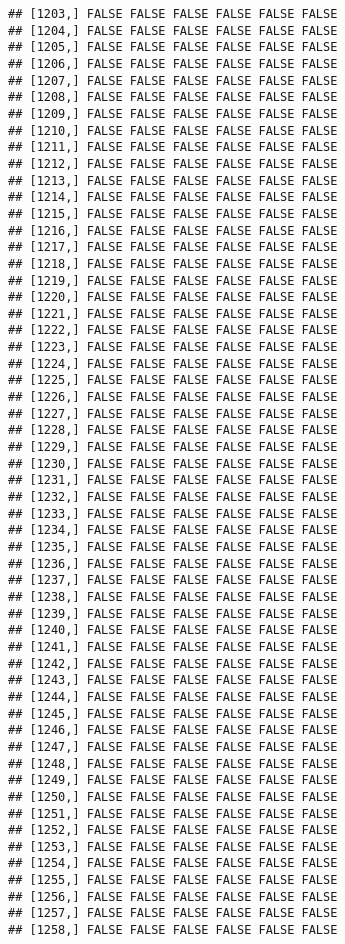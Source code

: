 \documentclass[
]{article}
\begin{document}
\begin{verbatim}
## [1203,] FALSE FALSE FALSE FALSE FALSE FALSE
## [1204,] FALSE FALSE FALSE FALSE FALSE FALSE
## [1205,] FALSE FALSE FALSE FALSE FALSE FALSE
## [1206,] FALSE FALSE FALSE FALSE FALSE FALSE
## [1207,] FALSE FALSE FALSE FALSE FALSE FALSE
## [1208,] FALSE FALSE FALSE FALSE FALSE FALSE
## [1209,] FALSE FALSE FALSE FALSE FALSE FALSE
## [1210,] FALSE FALSE FALSE FALSE FALSE FALSE
## [1211,] FALSE FALSE FALSE FALSE FALSE FALSE
## [1212,] FALSE FALSE FALSE FALSE FALSE FALSE
## [1213,] FALSE FALSE FALSE FALSE FALSE FALSE
## [1214,] FALSE FALSE FALSE FALSE FALSE FALSE
## [1215,] FALSE FALSE FALSE FALSE FALSE FALSE
## [1216,] FALSE FALSE FALSE FALSE FALSE FALSE
## [1217,] FALSE FALSE FALSE FALSE FALSE FALSE
## [1218,] FALSE FALSE FALSE FALSE FALSE FALSE
## [1219,] FALSE FALSE FALSE FALSE FALSE FALSE
## [1220,] FALSE FALSE FALSE FALSE FALSE FALSE
## [1221,] FALSE FALSE FALSE FALSE FALSE FALSE
## [1222,] FALSE FALSE FALSE FALSE FALSE FALSE
## [1223,] FALSE FALSE FALSE FALSE FALSE FALSE
## [1224,] FALSE FALSE FALSE FALSE FALSE FALSE
## [1225,] FALSE FALSE FALSE FALSE FALSE FALSE
## [1226,] FALSE FALSE FALSE FALSE FALSE FALSE
## [1227,] FALSE FALSE FALSE FALSE FALSE FALSE
## [1228,] FALSE FALSE FALSE FALSE FALSE FALSE
## [1229,] FALSE FALSE FALSE FALSE FALSE FALSE
## [1230,] FALSE FALSE FALSE FALSE FALSE FALSE
## [1231,] FALSE FALSE FALSE FALSE FALSE FALSE
## [1232,] FALSE FALSE FALSE FALSE FALSE FALSE
## [1233,] FALSE FALSE FALSE FALSE FALSE FALSE
## [1234,] FALSE FALSE FALSE FALSE FALSE FALSE
## [1235,] FALSE FALSE FALSE FALSE FALSE FALSE
## [1236,] FALSE FALSE FALSE FALSE FALSE FALSE
## [1237,] FALSE FALSE FALSE FALSE FALSE FALSE
## [1238,] FALSE FALSE FALSE FALSE FALSE FALSE
## [1239,] FALSE FALSE FALSE FALSE FALSE FALSE
## [1240,] FALSE FALSE FALSE FALSE FALSE FALSE
## [1241,] FALSE FALSE FALSE FALSE FALSE FALSE
## [1242,] FALSE FALSE FALSE FALSE FALSE FALSE
## [1243,] FALSE FALSE FALSE FALSE FALSE FALSE
## [1244,] FALSE FALSE FALSE FALSE FALSE FALSE
## [1245,] FALSE FALSE FALSE FALSE FALSE FALSE
## [1246,] FALSE FALSE FALSE FALSE FALSE FALSE
## [1247,] FALSE FALSE FALSE FALSE FALSE FALSE
## [1248,] FALSE FALSE FALSE FALSE FALSE FALSE
## [1249,] FALSE FALSE FALSE FALSE FALSE FALSE
## [1250,] FALSE FALSE FALSE FALSE FALSE FALSE
## [1251,] FALSE FALSE FALSE FALSE FALSE FALSE
## [1252,] FALSE FALSE FALSE FALSE FALSE FALSE
## [1253,] FALSE FALSE FALSE FALSE FALSE FALSE
## [1254,] FALSE FALSE FALSE FALSE FALSE FALSE
## [1255,] FALSE FALSE FALSE FALSE FALSE FALSE
## [1256,] FALSE FALSE FALSE FALSE FALSE FALSE
## [1257,] FALSE FALSE FALSE FALSE FALSE FALSE
## [1258,] FALSE FALSE FALSE FALSE FALSE FALSE

\end{verbatim}
\end{document}
